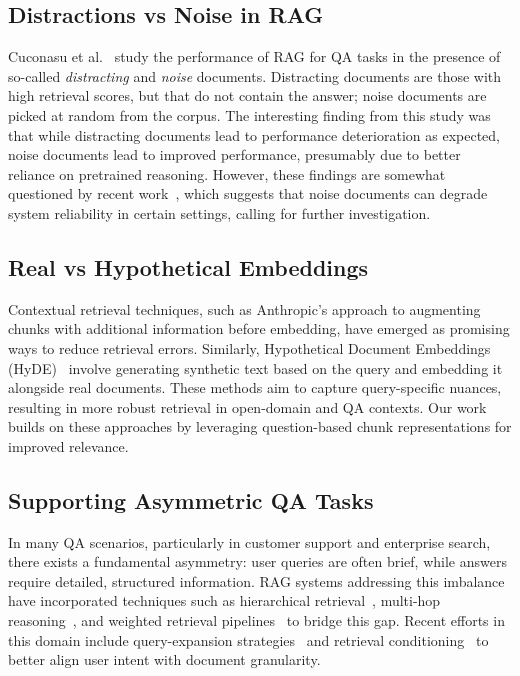 \subsection{Distractions vs Noise in RAG}
Cuconasu et al.~\cite{cuconasu} study the performance of RAG for QA tasks in the presence of so-called {\it distracting} and {\it noise} documents. Distracting documents are those with high retrieval scores, but that do not contain the answer; noise documents are picked at random from the corpus. The interesting finding from this study was that while distracting documents lead to performance deterioration as expected, noise documents lead to improved performance, presumably due to better reliance on pretrained reasoning. 
However, these findings are somewhat questioned by recent work~\cite{leto2024toward}, which suggests that noise documents can degrade system reliability in certain settings, calling for further investigation.


\subsection{Real vs Hypothetical Embeddings}
Contextual retrieval techniques, such as Anthropic's approach to augmenting chunks with additional information before embedding, have emerged as promising ways to reduce retrieval errors. Similarly, Hypothetical Document Embeddings (HyDE)~\cite{hyde2022} involve generating synthetic text based on the query and embedding it alongside real documents. These methods aim to capture query-specific nuances, resulting in more robust retrieval in open-domain and QA contexts. Our work builds on these approaches by leveraging question-based chunk representations for improved relevance.


\subsection{Supporting Asymmetric QA Tasks}
In many QA scenarios, particularly in customer support and enterprise search, there exists a fundamental asymmetry: user queries are often brief, while answers require detailed, structured information. RAG systems addressing this imbalance have incorporated techniques such as hierarchical retrieval~\cite{raga}, multi-hop reasoning~\cite{mavi2022multihop}, and weighted retrieval pipelines~\cite{ragc} to bridge this gap. Recent efforts in this domain include query-expansion strategies~\cite{ragf} and retrieval conditioning~\cite{ragg} to better align user intent with document granularity.


